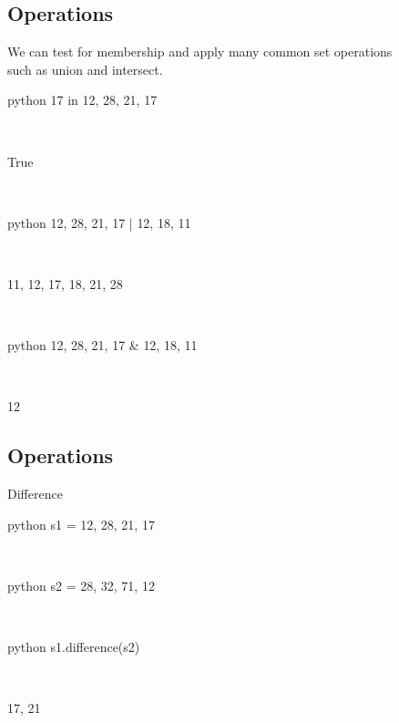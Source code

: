 \documentclass[aspectratio=1610,slidestop]{beamer}
\begin{document}
\subsection{Operations}
\begin{pframe}
 We can test for membership and apply many common set operations\\
 such as union and intersect.
 \medskip

 \begin{ipython}
  \begin{pythonin}{python}
17 in {12, 28, 21, 17}
  \end{pythonin}
  \\
  \begin{pythonout}
True
  \end{pythonout}
  \\

  \begin{pythonin}{python}
{12, 28, 21, 17} | {12, 18, 11}
  \end{pythonin}
  \\
  \begin{pythonout}
{11, 12, 17, 18, 21, 28}
  \end{pythonout}
  \\

  \begin{pythonin}{python}
{12, 28, 21, 17} & {12, 18, 11}
  \end{pythonin}
  \\
  \begin{pythonout}
{12}
  \end{pythonout}
 \end{ipython}
\end{pframe}


\subsection{Operations}
\begin{pframe}
 Difference
 \medskip

 \begin{ipython}
  \begin{pythonin}{python}
s1 = {12, 28, 21, 17}
  \end{pythonin}
  \\

  \begin{pythonin}{python}
s2 = {28, 32, 71, 12}
  \end{pythonin}
  \\

  \begin{pythonin}{python}
s1.difference(s2)
  \end{pythonin}
  \\
  \begin{pythonout}
{17, 21}
  \end{pythonout}
 \end{ipython}
\end{pframe}
\end{document}
